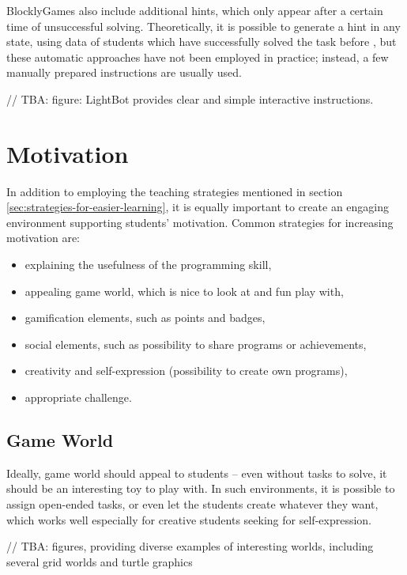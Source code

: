\documentclass[
    digital,
    color,
    11pt,
    nocover,
    table,  %
    nolof,  %
    nolot,  %
    microtype,
]{fithesis3}
\begin{document}
BlocklyGames also include additional hints,
  which only appear after a certain time of unsuccessful solving.
Theoretically, it is possible to generate a hint in any state,
  using data of students which have successfully solved the task before
  \cite{generating-hints},
  but these automatic approaches have not been employed in practice;
  instead, a few manually prepared instructions are usually used.

// TBA: figure: LightBot provides clear and simple interactive instructions.

\section{Motivation}
\label{sec:motivation}

In addition to employing the teaching strategies mentioned in section \ref{sec:strategies-for-easier-learning},
  it is equally important to create an engaging environment supporting students’ motivation. Common strategies for increasing motivation are:

\begin{itemize}
\item explaining the usefulness of the programming skill,
\item appealing game world, which is nice to look at and fun play with,
\item gamification elements, such as points and badges,
\item social elements, such as possibility to share programs or achievements,
\item creativity and self-expression (possibility to create own programs),
\item appropriate challenge.
\end{itemize}


\subsection{Game World}
\label{sec:motivation.game-world}
Ideally, game world should appeal to students --
even without tasks to solve,
  it should be an interesting toy to play with.
In such environments, it is possible to assign open-ended tasks,
  or even let the students create whatever they want,
  which works well especially for creative students seeking for self-expression.

// TBA: figures, providing diverse examples of interesting worlds, including several grid worlds and turtle graphics
\end{document}
